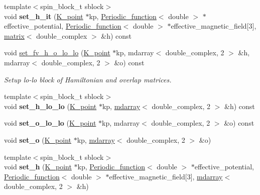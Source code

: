 \begin{DoxyCompactItemize}
\item 
\hypertarget{classsirius_1_1_band_adf665e41910ee47dd124acf43f4a315a}{}{\footnotesize template$<$spin\+\_\+block\+\_\+t sblock$>$ }\\void {\bfseries set\+\_\+h\+\_\+it} (\hyperlink{classsirius_1_1_k__point}{K\+\_\+point} $\ast$kp, \hyperlink{classsirius_1_1_periodic__function}{Periodic\+\_\+function}$<$ double $>$ $\ast$effective\+\_\+potential, \hyperlink{classsirius_1_1_periodic__function}{Periodic\+\_\+function}$<$ double $>$ $\ast$effective\+\_\+magnetic\+\_\+field\mbox{[}3\mbox{]}, \hyperlink{classsddk_1_1mdarray}{matrix}$<$ double\+\_\+complex $>$ \&h) const \label{classsirius_1_1_band_adf665e41910ee47dd124acf43f4a315a}

\item 
void \hyperlink{classsirius_1_1_band_a4a697e19033a0e64dc64baa231965ea0}{set\+\_\+fv\+\_\+h\+\_\+o\+\_\+lo\+\_\+lo} (\hyperlink{classsirius_1_1_k__point}{K\+\_\+point} $\ast$kp, mdarray$<$ double\+\_\+complex, 2 $>$ \&h, mdarray$<$ double\+\_\+complex, 2 $>$ \&o) const 
\begin{DoxyCompactList}\small\item\em Setup lo-\/lo block of Hamiltonian and overlap matrices. \end{DoxyCompactList}\item 
\hypertarget{classsirius_1_1_band_a9712fabdb24cd5b4357d164dc91787b1}{}{\footnotesize template$<$spin\+\_\+block\+\_\+t sblock$>$ }\\void {\bfseries set\+\_\+h\+\_\+lo\+\_\+lo} (\hyperlink{classsirius_1_1_k__point}{K\+\_\+point} $\ast$kp, \hyperlink{classsddk_1_1mdarray}{mdarray}$<$ double\+\_\+complex, 2 $>$ \&h) const \label{classsirius_1_1_band_a9712fabdb24cd5b4357d164dc91787b1}

\item 
\hypertarget{classsirius_1_1_band_a512e019410d231eb1a74bafe5adad48c}{}void {\bfseries set\+\_\+o\+\_\+lo\+\_\+lo} (\hyperlink{classsirius_1_1_k__point}{K\+\_\+point} $\ast$kp, mdarray$<$ double\+\_\+complex, 2 $>$ \&o) const \label{classsirius_1_1_band_a512e019410d231eb1a74bafe5adad48c}

\item 
\hypertarget{classsirius_1_1_band_aa197b236bf3ac146c55ce9a5b2e07e5b}{}void {\bfseries set\+\_\+o} (\hyperlink{classsirius_1_1_k__point}{K\+\_\+point} $\ast$kp, \hyperlink{classsddk_1_1mdarray}{mdarray}$<$ double\+\_\+complex, 2 $>$ \&o)\label{classsirius_1_1_band_aa197b236bf3ac146c55ce9a5b2e07e5b}

\item 
\hypertarget{classsirius_1_1_band_afdab745312743d79fbd65536cc0464c3}{}{\footnotesize template$<$spin\+\_\+block\+\_\+t sblock$>$ }\\void {\bfseries set\+\_\+h} (\hyperlink{classsirius_1_1_k__point}{K\+\_\+point} $\ast$kp, \hyperlink{classsirius_1_1_periodic__function}{Periodic\+\_\+function}$<$ double $>$ $\ast$effective\+\_\+potential, \hyperlink{classsirius_1_1_periodic__function}{Periodic\+\_\+function}$<$ double $>$ $\ast$effective\+\_\+magnetic\+\_\+field\mbox{[}3\mbox{]}, \hyperlink{classsddk_1_1mdarray}{mdarray}$<$ double\+\_\+complex, 2 $>$ \&h)\label{classsirius_1_1_band_afdab745312743d79fbd65536cc0464c3}


\end{DoxyCompactItemize}
